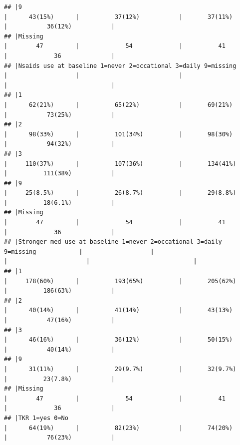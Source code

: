 \documentclass{article}
\begin{document}
\begin{verbatim}
## |9                                                                              |      43(15%)      |          37(12%)           |       37(11%)        |           36(12%)           |
## |Missing                                                                        |        47         |             54             |          41          |             36              |
## |Nsaids use at baseline 1=never 2=occational 3=daily 9=missing                  |                   |                            |                      |                             |
## |1                                                                              |      62(21%)      |          65(22%)           |       69(21%)        |           73(25%)           |
## |2                                                                              |      98(33%)      |          101(34%)          |       98(30%)        |           94(32%)           |
## |3                                                                              |     110(37%)      |          107(36%)          |       134(41%)       |          111(38%)           |
## |9                                                                              |     25(8.5%)      |          26(8.7%)          |       29(8.8%)       |          18(6.1%)           |
## |Missing                                                                        |        47         |             54             |          41          |             36              |
## |Stronger med use at baseline 1=never 2=occational 3=daily 9=missing            |                   |                            |                      |                             |
## |1                                                                              |     178(60%)      |          193(65%)          |       205(62%)       |          186(63%)           |
## |2                                                                              |      40(14%)      |          41(14%)           |       43(13%)        |           47(16%)           |
## |3                                                                              |      46(16%)      |          36(12%)           |       50(15%)        |           40(14%)           |
## |9                                                                              |      31(11%)      |          29(9.7%)          |       32(9.7%)       |          23(7.8%)           |
## |Missing                                                                        |        47         |             54             |          41          |             36              |
## |TKR 1=yes 0=No                                                                 |      64(19%)      |          82(23%)           |       74(20%)        |           76(23%)           |
\end{verbatim}
\end{document}
